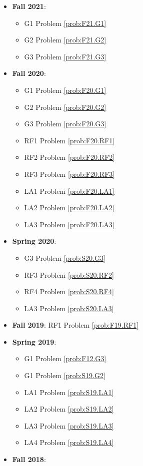 \documentclass{article}
\theoremstyle{definition}
\begin{document}
\begin{itemize}
	\item \textbf{Fall 2021}:
	\begin{itemize}
	\item G1 Problem \ref{prob:F21.G1} 
	\item G2 Problem \ref{prob:F21.G2}
	\item G3 Problem \ref{prob:F21.G3}
	\end{itemize}
	\item \textbf{Fall 2020}:
	\begin{itemize}
		\item G1 Problem \ref{prob:F20.G1} 
		\item G2 Problem \ref{prob:F20.G2}
		\item G3 Problem \ref{prob:F20.G3}
		\item RF1 Problem \ref{prob:F20.RF1}
		\item RF2 Problem \ref{prob:F20.RF2}
		\item RF3 Problem \ref{prob:F20.RF3}
		\item LA1 Problem \ref{prob:F20.LA1}
		\item LA2 Problem \ref{prob:F20.LA2}
		\item LA3 Problem \ref{prob:F20.LA3}	
	\end{itemize}
	\item \textbf{Spring 2020}:
	\begin{itemize}
		\item G3 Problem \ref{prob:S20.G3}
		\item RF3 Problem \ref{prob:S20.RF2}
		\item RF4 Problem \ref{prob:S20.RF4}
		\item LA3 Problem \ref{prob:S20.LA3}	
	\end{itemize}
	\item \textbf{Fall 2019}: RF1 Problem \ref{prob:F19.RF1}
	\item \textbf{Spring 2019}:
	\begin{itemize}
		\item G1 Problem \ref{prob:F12.G3}
		\item G1 Problem \ref{prob:S19.G2}
		\item LA1 Problem \ref{prob:S19.LA1}
		\item LA2 Problem \ref{prob:S19.LA2}
		\item LA3 Problem \ref{prob:S19.LA3}
		\item LA4 Problem \ref{prob:S19.LA4}	
	\end{itemize}
	\item \textbf{Fall 2018}: 

\end{itemize}
\end{document}
